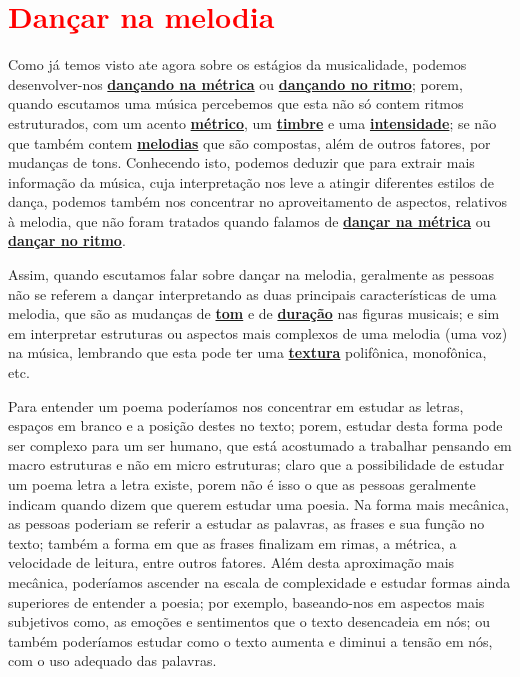 

\newpage
\section{\textcolor{red}{Dançar na melodia}}
\label{subsec:dancamelodia}

Como já temos visto ate agora sobre os estágios da musicalidade, 
 podemos desenvolver-nos  \hyperref[subsec:dancametrica]{\textbf{dançando na métrica}}  
ou \hyperref[subsec:dancaritmo]{\textbf{dançando no ritmo}};
porem, quando escutamos uma música percebemos que esta não só contem ritmos estruturados, 
com um acento \hyperref[def:Metrica]{\textbf{métrico}}, um \hyperref[sec:pos:timbre]{\textbf{timbre}} 
e uma \hyperref[sec:pos:Intensidade]{\textbf{intensidade}};
se não que também contem \hyperref[sec:pos:Melodia]{\textbf{melodias}} que são compostas, além de outros fatores, 
por mudanças de tons.
Conhecendo isto, 
podemos deduzir que para extrair mais informação da música,
cuja interpretação nos leve a atingir diferentes estilos de dança,
podemos também nos concentrar no aproveitamento de aspectos, relativos à melodia, que não foram tratados 
quando falamos de \hyperref[subsec:dancametrica]{\textbf{dançar na métrica}} ou 
\hyperref[subsec:dancaritmo]{\textbf{dançar no ritmo}}.


Assim, quando escutamos falar sobre dançar na melodia,
geralmente as pessoas não se referem a dançar interpretando as duas principais características de uma melodia,
que são as mudanças de \hyperref[sec:pos:Altura]{\textbf{tom}} e de
\hyperref[sec:pos:Duracion]{\textbf{duração}} nas figuras musicais;
e sim em interpretar estruturas ou aspectos mais complexos de uma melodia (uma voz) na música,
lembrando que esta pode ter uma \hyperref[sec:texturasmusica]{\textbf{textura}} polifônica, monofônica, etc. 


\begin{example}
Para entender um poema poderíamos nos concentrar em estudar as letras, 
espaços em branco  e a posição destes no texto;
porem, estudar desta forma pode ser complexo para um ser humano,
que está acostumado a trabalhar pensando em macro estruturas e não em micro estruturas;
claro que a possibilidade de estudar um poema letra a letra existe,
porem não é isso o que as pessoas geralmente indicam quando dizem que querem estudar uma poesia.
Na forma mais mecânica, 
as pessoas poderiam se referir a estudar as palavras, as frases e sua função no texto;
também a forma em que as frases finalizam em rimas, a métrica,
a velocidade de leitura, entre outros fatores.
Além desta aproximação mais mecânica, 
poderíamos ascender na escala de complexidade e estudar formas ainda superiores de entender a poesia;
por exemplo, baseando-nos em aspectos mais subjetivos como, 
as emoções e sentimentos  que o texto desencadeia em nós;
ou também poderíamos estudar como o texto aumenta e diminui a tensão em nós,
 com o uso adequado das palavras.
\end{example}

